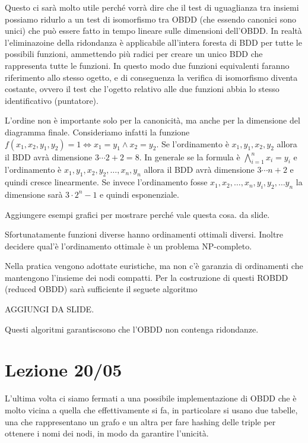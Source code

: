 Questo ci sarà molto utile perché vorrà dire che il test di uguaglianza tra insiemi possiamo ridurlo a un test di isomorfismo tra OBDD (che essendo canonici sono unici) che può essere fatto in tempo lineare sulle dimensioni dell'OBDD\@. In realtà l'eliminazoine della ridondanza è applicabile all'intera foresta di BDD per tutte le possibili funzioni, ammettendo più radici per creare un unico BDD che rappresenta tutte le funzioni. In questo modo due funzioni equivalenti faranno riferimento allo stesso ogetto, e di conseguenza la verifica di isomorfismo diventa costante, ovvero il test che l'ogetto relativo alle due funzioni abbia lo stesso identificativo (puntatore).

L'ordine non è importante solo per la canonicità, ma anche per la dimensione del diagramma finale. Consideriamo infatti la funzione \(f(x_1,x_2,y_1,y_2) = 1 \iff x_1 = y_1 \land x_2 = y_2\). Se l'ordinamento è \(x_1,y_1,x_2,y_2\) allora il BDD avrà dimensione \(3 \cdots 2 +2  = 8\). In generale se la formula è \(\bigwedge_{i=1}^n x_i = y_i\) e l'ordinamento è \(x_1,y_1,x_2,y_2,\dots,x_n,y_n\) allora il BDD avrà dimensione \(3 \cdots n +2\) e quindi cresce linearmente. Se invece l'ordinamento fosse \(x_1,x_2,\ldots, x_n,y_i,y_2, \ldots y_n\) la dimensione sarà \(3\cdot 2^n-1\) e quindi esponenziale.

Aggiungere esempi grafici per mostrare perché vale questa cosa. da slide.

Sfortunatamente funzioni diverse hanno ordinamenti ottimali diversi. Inoltre decidere qual'è l'ordinamento ottimale è un problema NP-completo.

Nella pratica vengono adottate euristiche, ma non c'è garanzia di ordinamenti che mantengono l'insieme dei nodi compatti.
Per la costruzione di questi ROBDD (reduced OBDD) sarà sufficiente il seguete algoritmo

AGGIUNGI DA SLIDE.

Questi algoritmi garantiscsono che l'OBDD non contenga ridondanze.

\chapter{Lezione 20/05}

L'ultima volta ci siamo fermati a una possibile implementazione di OBDD che è molto vicina a quella che effettivamente si fa, in particolare si usano due tabelle, una che rappresentano un grafo e un altra per fare hashing delle triple per ottenere i nomi dei nodi, in modo da garantire l'unicità.

